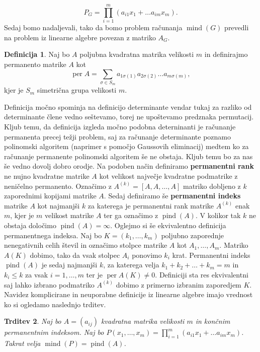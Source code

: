 \documentclass[12pt,a4paper,twoside]{article}
\theoremstyle{definition} %
\newtheorem{definicija}{Definicija}[section]
\theoremstyle{plain} %
\newtheorem{trditev}[definicija]{Trditev}
\numberwithin{equation}{section}  %
\DeclareMathOperator{\per}{per}
\DeclareMathOperator{\mind}{mind}
\DeclareMathOperator{\pind}{pind}
\begin{document}
$$P_G = \prod_{i=1}^m (a_{i1}x_1 + \ldots a_{im}x_m).$$
Sedaj bomo nadaljevali, tako da bomo problem računanja $\mind(G)$ prevedli na problem iz linearne algebre povezan z matriko $A_G$. 
 \begin{definicija}
Naj bo $A$ poljubna kvadratna matrika velikosti $m$ in definirajmo permanento matrike $A$ kot 
$$ \per A = \sum_{\sigma \in S_m} a_{1\sigma(1)} a_{2\sigma(2)} \ldots a_{m\sigma(m)} ,$$
kjer je $S_m$ simetrična grupa velikosti $m$.
\end{definicija}
Definicija močno spominja na definicijo determinante vendar tukaj za razliko od determinante člene vedno seštevamo, torej ne upoštevamo predznaka permutacij. Kljub temu, da definicija izgleda močno podobna deterninanti je računanje permanenta precej težji problem, saj za računanje determinante poznamo polinomski algoritem (naprimer s pomočjo Gaussovih eliminacij) medtem ko za računanje permanente polinomski algoritem še ne obstaja. Kljub temu bo za nas še vedno dovolj dobro orodje. Na podoben način definiramo \textbf{permanentni rank} ne nujno kvadratne matrike $A$ kot velikost največje kvadratne podmatrike z neničelno permanento. Označimo  z $A^{(k)} = [A,A, \ldots, A]$ matriko dobljeno z $k$ zaporednimi kopijami matrike $A$. Sedaj definiramo še \textbf{permanentni indeks} matrike $A$ kot najmanjši $k$ za katerega je permanentni rank matrike $A^{(k)}$ enak $m$, kjer je $m$ velikost matrike $A$ ter ga označimo z $\pind(A)$. V kolikor tak $k$ ne obstaja določimo $\pind(A) = \infty$. Oglejmo si še ekvivalentno definicija permanentnega indeksa. Naj bo $K = (k_1, \ldots, k_m)$ poljubno zaporednje nenegativnih celih števil in označimo stolpce matrike $A$ kot $A_1, \ldots, A_m$. Matriko $A(K)$ dobimo, tako da vsak stolpec $A_i$ ponovimo $k_i$ krat. Permanentni indeks $\pind(A)$ je sedaj najmanjši $k$, za katerega velja $k_1 + k_2 + \ldots + k_m = m$ in $k_i \le k$ za vsak $i = 1, \ldots, m$ ter je $\per A(K) \neq 0$. Definiciji sta res ekvivalentni saj lahko izbrano podmatriko $A^{(k)}$ dobimo z primerno izbranim zaporedjem $K$. Navidez komplicirane in neuporabne definicije iz linearne algebre imajo vrednost ko si ogledamo naslednjo trditev.

\begin{trditev}
\label{mpind}
Naj bo $A = (a_{ij})$ kvadratna matrika velikosti $m$ in končnim permanentnim indeksom. Naj bo $P(x_1, \ldots, x_m) = \prod_{i=1}^m (a_{i1}x_1 + \ldots a_{im}x_m)$. Takrat velja $\mind(P) = \pind(A)$.
\end{trditev}
\end{document}
